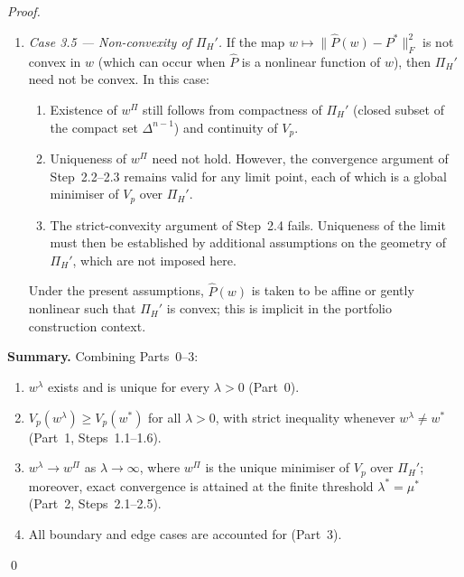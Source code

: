 \documentclass[12pt,openany]{book}
\newcommand{\bfw}{\mathbf{w}}
\numberwithin{equation}{chapter}
\theoremstyle{plain}
\theoremstyle{definition}
\theoremstyle{remark}
\def\bfw{w}%
\begin{document}
\begin{proof}
\begin{enumerate}
  \item \emph{Case 3.5 — Non-convexity of $\Pi_H'$.}
        If the map $\bfw \mapsto \|\hat{P}(\bfw) - P^*\|_F^2$ is
        not convex in $\bfw$ (which can occur when $\hat{P}$ is a
        nonlinear function of $\bfw$), then $\Pi_H'$ need not be
        convex.  In this case:
        \begin{enumerate}
          \item[(a)] Existence of $\bfw^{\Pi}$ still follows from
                compactness of $\Pi_H'$ (closed subset of the compact
                set $\Delta^{n-1}$) and continuity of $V_p$.
          \item[(b)] Uniqueness of $\bfw^{\Pi}$ need not hold.  However,
                the convergence argument of Step~2.2--2.3 remains valid
                for any limit point, each of which is a global minimiser
                of $V_p$ over $\Pi_H'$.
          \item[(c)] The strict-convexity argument of Step~2.4 fails.
                Uniqueness of the limit must then be established by
                additional assumptions on the geometry of $\Pi_H'$,
                which are not imposed here.
        \end{enumerate}
        Under the present assumptions, $\hat{P}(\bfw)$ is taken to be
        affine or gently nonlinear such that $\Pi_H'$ is convex;
        this is implicit in the portfolio construction context.
\end{enumerate}

\medskip
\noindent\textbf{Summary.}
Combining Parts~0--3:
\begin{enumerate}
  \item $\bfw^\lambda$ exists and is unique for every $\lambda > 0$
        (Part~0).
  \item $V_p(\bfw^\lambda) \geq V_p(\bfw^*)$ for all $\lambda > 0$,
        with strict inequality whenever $\bfw^\lambda \neq \bfw^*$
        (Part~1, Steps~1.1--1.6).
  \item $\bfw^\lambda \to \bfw^{\Pi}$ as $\lambda \to \infty$,
        where $\bfw^{\Pi}$ is the unique minimiser of $V_p$ over
        $\Pi_H'$; moreover, exact convergence is attained at the
        finite threshold $\lambda^* = \mu^*$ (Part~2,
        Steps~2.1--2.5).
  \item All boundary and edge cases are accounted for (Part~3).
\end{enumerate}
\qed
\end{proof}

\end{document}
